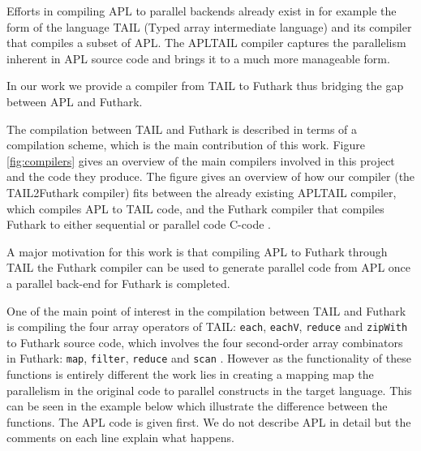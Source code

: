 \documentclass[11pt]{article}
\begin{document}
Efforts in compiling APL to parallel backends already exist in for example the form of the language 
TAIL (Typed array intermediate language) and its compiler \cite{ElsmanDybdal:Array:2014} that compiles a subset of APL.
The APLTAIL compiler captures the parallelism inherent in APL source code and brings it to a much more manageable form.

In our work we provide a compiler from TAIL 
to Futhark thus bridging the gap between APL and Futhark.

The compilation between TAIL and Futhark is described in terms of a compilation scheme, which is the main contribution of this work. 
Figure \ref{fig:compilers} gives an overview of the main compilers involved in this project and the code they produce.
The figure gives an overview of how our compiler (the TAIL2Futhark compiler) fits between the already existing APLTAIL compiler, which compiles APL to TAIL code, and the Futhark compiler that compiles Futhark to either sequential or parallel code C-code \cite{TroelsHenriksen}. 

A major motivation for this work is that compiling APL to Futhark through TAIL the Futhark compiler can be used to generate parallel code from APL once a parallel back-end for Futhark is completed.

One of the main point of interest in the compilation between TAIL and Futhark is compiling the four array operators 
of TAIL: {\tt each}, {\tt eachV}, 
 {\tt reduce} and {\tt zipWith} to Futhark source code, which involves the four second-order array combinators in Futhark:  
 {\tt map}, {\tt filter}, {\tt reduce} and {\tt scan} \cite{ElsmanDybdal:Array:2014}\cite{TroelsHenriksen}. 
However as the functionality of these functions is entirely different the work lies in creating a mapping map the parallelism in the original code to parallel constructs in the target language.
This can be seen in the example below which illustrate the difference between the functions. 
The APL code is given first. We do not describe APL in detail but the comments on each line explain what happens. 
\end{document}
